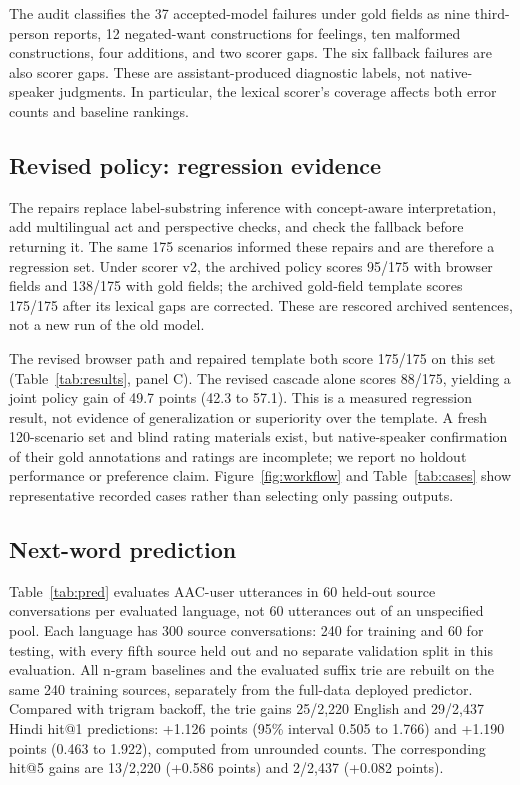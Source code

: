 The audit classifies the 37 accepted-model failures under gold fields as nine third-person reports, 12 negated-want constructions for feelings, ten malformed constructions, four additions, and two scorer gaps.
The six fallback failures are also scorer gaps.
These are assistant-produced diagnostic labels, not native-speaker judgments.
In particular, the lexical scorer's coverage affects both error counts and baseline rankings.

\subsection{Revised policy: regression evidence}
The repairs replace label-substring inference with concept-aware interpretation, add multilingual act and perspective checks, and check the fallback before returning it.
The same 175 scenarios informed these repairs and are therefore a regression set.
Under scorer v2, the archived policy scores 95/175 with browser fields and 138/175 with gold fields; the archived gold-field template scores 175/175 after its lexical gaps are corrected.
These are rescored archived sentences, not a new run of the old model.

The revised browser path and repaired template both score 175/175 on this set (Table~\ref{tab:results}, panel C).
The revised cascade alone scores 88/175, yielding a joint policy gain of 49.7 points (42.3 to 57.1).
This is a measured regression result, not evidence of generalization or superiority over the template.
A fresh 120-scenario set and blind rating materials exist, but native-speaker confirmation of their gold annotations and ratings are incomplete; we report no holdout performance or preference claim.
Figure~\ref{fig:workflow} and Table~\ref{tab:cases} show representative recorded cases rather than selecting only passing outputs.



\subsection{Next-word prediction}
Table~\ref{tab:pred} evaluates AAC-user utterances in 60 held-out source conversations per evaluated language, not 60 utterances out of an unspecified pool.
Each language has 300 source conversations: 240 for training and 60 for testing, with every fifth source held out and no separate validation split in this evaluation.
All n-gram baselines and the evaluated suffix trie are rebuilt on the same 240 training sources, separately from the full-data deployed predictor.
Compared with trigram backoff, the trie gains 25/2,220 English and 29/2,437 Hindi hit@1 predictions: +1.126 points (95\% interval 0.505 to 1.766) and +1.190 points (0.463 to 1.922), computed from unrounded counts.
The corresponding hit@5 gains are 13/2,220 (+0.586 points) and 2/2,437 (+0.082 points).

